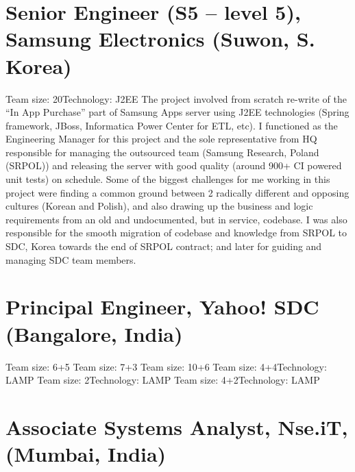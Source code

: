 \documentclass[11pt,a4paper,sans]{moderncv} %
\begin{document}
\section{Senior Engineer (S5 -- level 5), Samsung Electronics (Suwon, S. Korea)}
         {Team size: 20}{Technology: J2EE}
         {The project involved from scratch re-write of the ``In App Purchase'' part of Samsung Apps server using J2EE technologies (Spring framework, JBoss, Informatica Power Center for ETL, etc). I functioned as the Engineering Manager for this project and the sole representative from HQ responsible for managing the outsourced team (Samsung Research, Poland (SRPOL)) and releasing the server with good quality (around 900+ CI powered unit tests) on schedule. Some of the biggest challenges for me working in this project were finding a common ground between 2 radically different and opposing cultures (Korean and Polish), and also drawing up the business and logic requirements from an old and undocumented, but in service, codebase. I was also responsible for the smooth migration of codebase and knowledge from SRPOL to SDC, Korea towards the end of SRPOL contract; and later for guiding and managing SDC team members.}

\section{Principal Engineer, Yahoo! SDC (Bangalore, India)}
         {Team size: 6+5}{}{}
         {Team size: 7+3}{}{}
         {Team size: 10+6}{}{}
         {Team size: 4+4}{Technology: LAMP}{}
         {Team size: 2}{Technology: LAMP}{}
         {Team size: 4+2}{Technology: LAMP}{}

\section{Associate Systems Analyst, Nse.iT, (Mumbai, India)}
\end{document}
